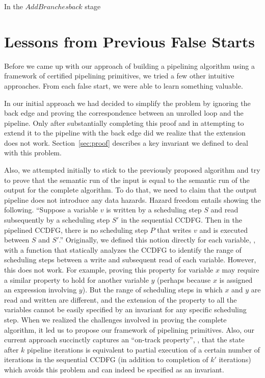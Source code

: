 In the $AddBranches back$ stage

\section{Lessons from Previous False Starts}

Before we came up with our approach of building a pipelining
algorithm using a framework of certified pipelining primitives,
we tried a few other intuitive approaches.
From each false start, we were able to learn something valuable.

In our initial approach we had decided to simplify the problem
by ignoring the back edge and proving the correspondence
between an unrolled loop and the pipeline.
Only after substantially completing this proof and in
attempting to extend it to the pipeline with the back edge
did we realize that the extension does not work. Section~\ref{sec:proof} describes a key
invariant we defined to deal with this problem.

Also, we attempted initially to stick to the previously proposed algorithm
and try to prove that the semantic run of the input is equal to the semantic run
of the output for the complete algorithm. To do that, we need to claim that
the output pipeline does not introduce any data hazards.
Hazard freedom entails showing the
following. ``Suppose a variable $v$ is written by a
scheduling step $S$ and read subsequently by a scheduling
step $S'$ in the sequential CCDFG.  Then in the pipelined
CCDFG, there is no scheduling step $P$ that writes $v$ and
is executed between $S$ and $S'$.''  Originally, we defined
this notion directly for each variable, \viz, with a
function that statically analyzes the CCDFG to identify the
range of scheduling steps between a write and subsequent
read of each variable.  However, this does not
work.  For example, proving this property for variable $x$
may require a similar property to hold for another variable
$y$ (perhaps because $x$ is assigned an expression involving
$y$).  But the range of scheduling steps in which $x$ and
$y$ are read and written are different, and the extension of
the property to all the variables cannot be easily specified
by an invariant for any specific scheduling step. When we realized
the challenges involved in proving the complete algorithm,
it led us to propose our framework of pipelining primitives.
Also, our current approach succinctly captures an ``on-track property'',
\viz, that the
state after $k$ pipeline iterations is equivalent to partial
execution of a certain number of iterations in the
sequential CCDFG (in addition to completion of $k'$
iterations) which avoids this problem and can indeed be
specified as an invariant.


